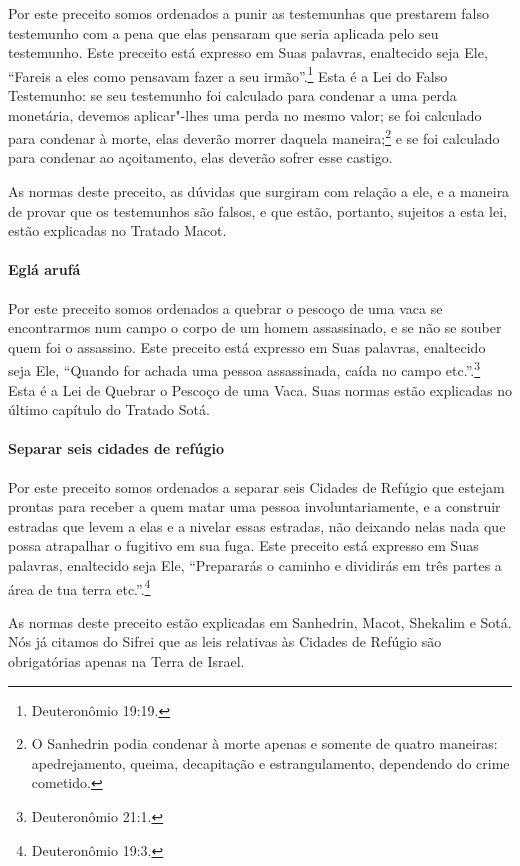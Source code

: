 \begin{multicols}{2}
Por este preceito somos ordenados a punir as testemunhas que prestarem
falso testemunho com a pena que elas pensaram que seria aplicada pelo
seu testemunho. Este preceito está expresso em Suas palavras, enaltecido
seja Ele, ``Fareis a eles como pensavam fazer a seu irmão''.\footnote{Deuteronômio 19:19.} Esta é a Lei do Falso Testemunho: se seu
testemunho foi calculado para condenar a uma perda monetária, devemos aplicar"-lhes uma perda no mesmo valor;
se foi calculado para condenar à morte, elas deverão morrer daquela
maneira;\footnote{O Sanhedrin\starr{} podia condenar à morte apenas e somente de quatro
maneiras: apedrejamento, queima, decapitação e estrangulamento,
dependendo do crime cometido.}
e se foi calculado para condenar ao açoitamento, elas deverão sofrer
esse castigo.

As normas deste preceito, as dúvidas que surgiram com relação a ele, e a
maneira de provar que os testemunhos são falsos, e que estão, portanto,
sujeitos a esta lei, estão explicadas no Tratado Macot\starr.


\paragraph{Eglá arufá\starr}

Por este preceito somos ordenados a quebrar o pescoço de uma vaca se
encontrarmos num campo o corpo de um homem assassinado, e se não se
souber quem foi o assassino. Este preceito está expresso em Suas
palavras, enaltecido seja Ele, ``Quando for achada uma pessoa
assassinada, caída no campo etc.''.\footnote{Deuteronômio 21:1.} Esta é a Lei de
Quebrar o Pescoço de uma Vaca. Suas normas estão explicadas no último
capítulo do Tratado Sotá\starr.

\paragraph{Separar seis cidades de refúgio}

Por este preceito somos ordenados a separar seis Cidades de Refúgio que
estejam prontas para receber a quem matar uma pessoa involuntariamente,
e a construir estradas que levem a elas e a nivelar essas estradas, não
deixando nelas nada que possa atrapalhar o fugitivo em sua fuga. Este
preceito está expresso em Suas palavras, enaltecido seja Ele,
``Prepararás o caminho e dividirás em três partes a área de tua terra
etc.''.\footnote{Deuteronômio 19:3.}

As normas deste preceito estão explicadas em Sanhedrin\starr, Macot\starr, Shekalim\starr{}
e Sotá\starr. Nós já citamos do Sifrei\starr{} que as leis relativas às Cidades de
Refúgio são obrigatórias apenas na Terra de Israel.


\end{multicols}
